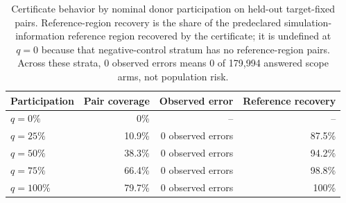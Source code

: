 \begin{table}[!ht]
\centering
\caption{Certificate behavior by nominal donor participation on held-out
target-fixed pairs. Reference-region recovery is the share of the
predeclared simulation-information reference region recovered by the
certificate; it is undefined at $q=0$ because that negative-control
stratum has no reference-region pairs. Across these strata, 0 observed
errors means 0 of 179,994 answered scope arms, not population risk.}
\label{tab:v05-certificate}
\small
\begin{tabular}{lrrr}
\toprule
Participation & Pair coverage & Observed error & Reference recovery \\
\midrule
$q=0\%$ & 0\% & -- & -- \\
$q=25\%$ & 10.9\% & 0 observed errors & 87.5\% \\
$q=50\%$ & 38.3\% & 0 observed errors & 94.2\% \\
$q=75\%$ & 66.4\% & 0 observed errors & 98.8\% \\
$q=100\%$ & 79.7\% & 0 observed errors & 100\% \\
\bottomrule
\end{tabular}
\end{table}
